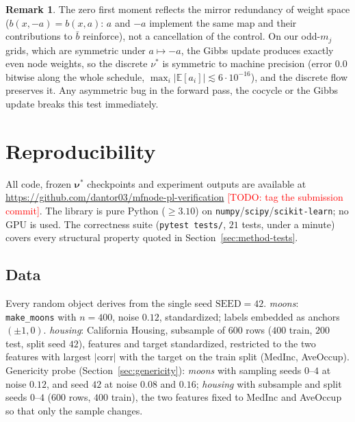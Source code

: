 \documentclass[11pt,leqno]{amsart}
\newcommand{\todo}[1]{\textcolor{red}{[TODO: #1]}}
\newcommand{\E}{\mathbb{E}}
\newcommand{\bnu}{\boldsymbol{\nu}}
\numberwithin{equation}{section}
\theoremstyle{definition}
\newtheorem{rmk}[thm]{Remark}
\begin{document}
\begin{rmk}
The zero first moment reflects the mirror redundancy of weight space
($b(x,-a)=b(x,a)$: $a$ and $-a$ implement the same map and their
contributions to $\bar b$ reinforce), not a cancellation of the control.
On our odd-$m_j$ grids, which are symmetric under $a\mapsto-a$, the Gibbs
update produces exactly even node weights, so the discrete $\nu^*$ is
symmetric to machine precision (error $0.0$ bitwise along the whole
schedule, $\max_i|\E[a_i]|\lesssim6\cdot10^{-16}$), and the discrete flow
preserves it.  Any asymmetric bug in the forward pass, the cocycle or the
Gibbs update breaks this test immediately.
\end{rmk}

\section{Reproducibility}
\label{app:repro}

All code, frozen $\bnu^*$ checkpoints and experiment outputs are available
at \url{https://github.com/dantor03/mfnode-pl-verification}
\todo{tag the submission commit}.  The library is pure Python
($\ge3.10$) on \texttt{numpy}/\texttt{scipy}/\texttt{scikit-learn}; no GPU
is used.  The correctness suite (\texttt{pytest tests/}, $21$ tests,
under a minute) covers every structural property quoted in
Section~\ref{sec:method-tests}.

\subsection*{Data}
Every random object derives from the single seed $\mathrm{SEED}=42$.
\emph{moons}: \texttt{make\_moons} with $n=400$, noise $0.12$,
standardized; labels embedded as anchors $(\pm1,0)$.
\emph{housing}: California Housing, subsample of $600$ rows
($400$ train, $200$ test, split seed $42$), features and target
standardized, restricted to the two features with largest
$|\mathrm{corr}|$ with the target on the train split (MedInc, AveOccup).
Genericity probe (Section~\ref{sec:genericity}): \emph{moons} with
sampling seeds $0$--$4$ at noise $0.12$, and seed $42$ at noise $0.08$ and
$0.16$; \emph{housing} with subsample and split seeds $0$--$4$ ($600$ rows,
$400$ train), the two features fixed to MedInc and AveOccup so that only
the sample changes.
\end{document}
